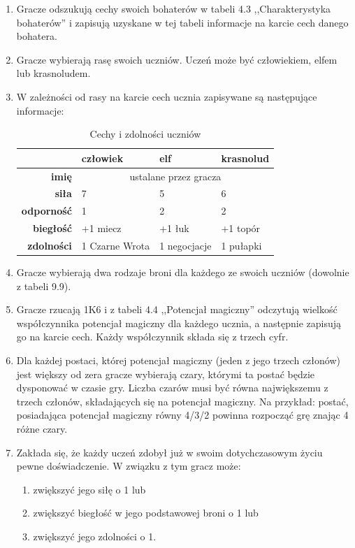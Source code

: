\begin{enumerate}
    \item
        Gracze odszukują cechy swoich bohaterów w tabeli 4.3 ,,Charakterystyka bohaterów'' i zapisują uzyskane w tej tabeli informacje na karcie cech danego bohatera.
    \item
        Gracze wybierają rasę swoich uczniów.
        Uczeń może być człowiekiem, elfem lub krasnoludem.
    \item
        W zależności od rasy na karcie cech ucznia zapisywane są następujące informacje:
        \begin{table}[H]
            \centering
            \caption{Cechy i zdolności uczniów}
            \label{tab:mnozenie}
            \begin{tabular}{rlll}
                \toprule
                & \textbf{człowiek} & \textbf{elf} & \textbf{krasnolud} \\
                \midrule
                \textbf{imię} & \multicolumn{3}{c}{ustalane przez gracza} \\
                \textbf{siła} & 7 & 5 & 6 \\
                \textbf{odporność} & 1 & 2 & 2 \\
                \textbf{biegłość} & +1 miecz & +1 łuk & +1 topór \\
                \textbf{zdolności} & 1 Czarne Wrota & 1 negocjacje & 1 pułapki \\
                \bottomrule
            \end{tabular}
        \end{table}
    \item
        Gracze wybierają dwa rodzaje broni dla każdego ze swoich uczniów (dowolnie z tabeli 9.9).
    \item
        Gracze rzucają 1K6 i z tabeli 4.4 ,,Potencjał magiczny'' odczytują wielkość współczynnika potencjał magiczny dla każdego ucznia, a następnie zapisują go na karcie cech.
        Każdy współczynnik składa się z trzech cyfr.
    \item
        Dla każdej postaci, której potencjał magiczny (jeden z jego trzech członów) jest większy od zera gracze wybierają czary, którymi ta postać będzie dysponować w czasie gry.
        Liczba czarów musi być równa największemu z trzech członów, składających się na potencjał magiczny.
        Na przykład: postać, posiadająca potencjał magiczny równy 4/3/2 powinna rozpocząć grę znając 4 różne czary.
    \item
        Zakłada się, że każdy uczeń zdobył już w swoim dotychczasowym życiu pewne doświadczenie.
        W związku z tym gracz może:
        \begin{enumerate}
            \item
                zwiększyć jego siłę o 1 lub
            \item
                zwiększyć biegłość w jego podstawowej broni o 1 lub
            \item
                zwiększyć jego zdolności o 1.
        \end{enumerate}
\end{enumerate}


